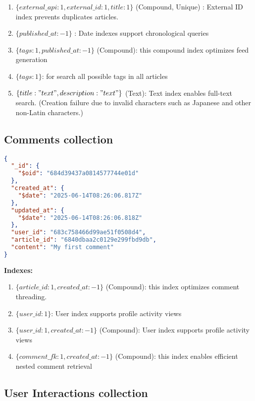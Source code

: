 \begin{enumerate}
  \item $\{ external\_api: 1, external\_id: 1, title: 1 \}$ (Compound, Unique) : External ID index prevents duplicates articles.
  \item $\{ published\_at: -1 \}$ : Date indexes support chronological queries
  \item $\{ tags: 1, published\_at: -1 \}$ (Compound): this compound index optimizes feed generation
  \item $\{ tags: 1 \}$: for search all possible tags in all articles
  \item $\{ title: "text", description: "text" \}$ (Text): Text index enables full-text search.
  (Creation failure due to invalid characters such as Japanese and other non-Latin characters.)
\end{enumerate}

\subsection{Comments collection}\label{subsec:comments-collection}

\begin{lstlisting}[language=json,label={lst:comments-collection-json-example}]
{
  "_id": {
    "$oid": "684d39437a0814577744e01d"
  },
  "created_at": {
    "$date": "2025-06-14T08:26:06.817Z"
  },
  "updated_at": {
    "$date": "2025-06-14T08:26:06.818Z"
  },
  "user_id": "683c758466d99ae51f0508d4",
  "article_id": "6840dbaa2c0129e299fbd9db",
  "content": "My first comment"
}
\end{lstlisting}

\textbf{Indexes:}

\begin{enumerate}
  \item $\{ article\_id: 1, created\_at: -1 \}$ (Compound): this index optimizes comment threading.
  \item $\{ user\_id: 1 \}$: User index supports profile activity views
  \item $\{ user\_id: 1, created\_at: -1 \}$ (Compound): User index supports profile activity views
  \item $\{ comment\_fk: 1, created\_at: -1 \}$ (Compound): this index enables efficient nested comment retrieval
\end{enumerate}

\subsection{User Interactions collection}\label{subsec:user-interactions-collection}

